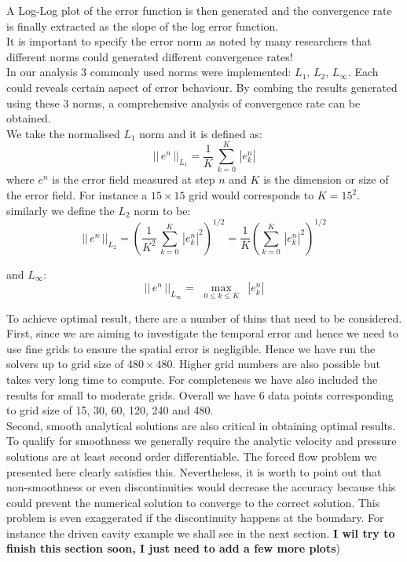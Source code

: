 A Log-Log plot of the error function is then generated and the convergence rate is finally extracted as the slope of the log error function.\\

It is important to specify the error norm as noted by many researchers that different norms could generated different convergence rates! \cite{pyo2005normal,guermond2004error}\\
In our analysis 3 commonly used norms were implemented: $L_1,\,L_2,\,L_\infty$. Each could reveals certain aspect of error behaviour. By combing the results generated using these 3 norms, a comprehensive analysis of convergence rate can be obtained.\\

We take the normalised $L_1$ norm and it is defined as:
\begin{equation}
||\,e^n\,||_{L_1} = \dfrac{1}{K}\,\sum^K_{k=0}\,|e^n_k|
\end{equation} 
where $e^n$ is the error field measured at step $n$ and $K$ is the dimension or size of the error field. For instance a $15 \times 15$ grid would corresponds to $K = 15^2$.\\

similarly we define the $L_2$ norm to be:
\begin{equation}
||\,e^n\,||_{L_2} = \left(\dfrac{1}{K^2}\,\sum^K_{k=0}\,|e^n_k|^2\right)^{1/2} = \dfrac{1}{K}\left(\sum^K_{k=0}\,|e^n_k|^2\right)^{1/2}
\end{equation}

and $L_\infty$:
\begin{equation}
||\,e^n\,||_{L_\infty} = \max_{\,\,\,0 \leq k \leq K\,\,\,}\,|e^n_k|
\end{equation}

To achieve optimal result, there are a number of thins that need to be considered. \\
First, since we are aiming to investigate the temporal error and hence we need to use fine grids to ensure the spatial error is negligible. Hence we have run the solvers up to grid size of $480 \times 480$. Higher grid numbers are also possible but takes very long time to compute. For completeness we have also included the results for small to moderate grids. Overall we have 6 data points corresponding to grid size of 15, 30, 60, 120, 240 and 480.\\

Second, smooth analytical solutions are also critical in obtaining optimal results. To qualify for smoothness we generally require the analytic velocity and pressure solutions are at least second order differentiable. The forced flow problem we presented here clearly satisfies this. Nevertheless, it is worth to point out that non-smoothness or even discontinuities would decrease the accuracy because this could prevent the numerical solution to converge to the correct solution. This problem is even exaggerated if the discontinuity happens at the boundary. For instance the driven cavity example we shall see in the next section. \textbf{I wil try to finish this section soon, I just need to add a few more plots})\\

